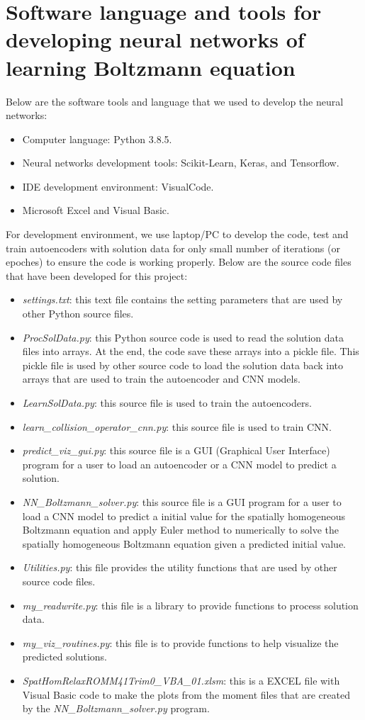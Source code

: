 \documentclass{article}
\begin{document}
\section{Software language and tools for developing neural networks of learning Boltzmann equation}
Below are the software tools and language that we used to develop the neural networks:
\begin{itemize}
	\item Computer language: Python 3.8.5.
	\item Neural networks development tools: Scikit-Learn, Keras, and Tensorflow.
	\item IDE development environment: VisualCode.
	\item Microsoft Excel and Visual Basic.
\end{itemize}
For development environment, we use laptop/PC to develop the code, test and train autoencoders with solution data for only small number of iterations (or epoches) to ensure the code is working properly. Below are the source code files that have been developed for this project:
\begin{itemize}
	\item \emph{settings.txt}: this text file contains the setting parameters that are used by other Python source files.
	\item \emph{ProcSolData.py}: this Python source code is used to read the solution data files into arrays. At the end, the code save these arrays into a pickle file. This pickle file is used by other source code to load the solution data back into arrays that are used to train the autoencoder and CNN models.
	\item \emph{LearnSolData.py}: this source file is used to train the autoencoders.
	\item \emph{learn\_collision\_operator\_cnn.py}: this source file is used to train CNN.
	\item \emph{predict\_viz\_gui.py}: this source file is a GUI (Graphical User Interface) program for a user to load an autoencoder or a CNN model to predict a solution.
	\item \emph{NN\_Boltzmann\_solver.py}: this source file is a GUI program for a user to load a CNN model to predict a initial value for the spatially homogeneous Boltzmann equation and apply Euler method to numerically to solve the spatially homogeneous Boltzmann equation given a predicted initial value.
	\item \emph{Utilities.py}: this file provides the utility functions that are used by other source code files.
	\item \emph{my\_readwrite.py}: this file is a library to provide functions to process solution data.
	\item \emph{my\_viz\_routines.py}: this file is to provide functions to help visualize the predicted solutions.	
	\item \emph{SpatHomRelaxROMM41Trim0\_VBA\_01.xlsm}: this is a EXCEL file with Visual Basic code to make the plots from the moment files that are created by the \emph{NN\_Boltzmann\_solver.py} program.
\end{itemize}
\end{document}

